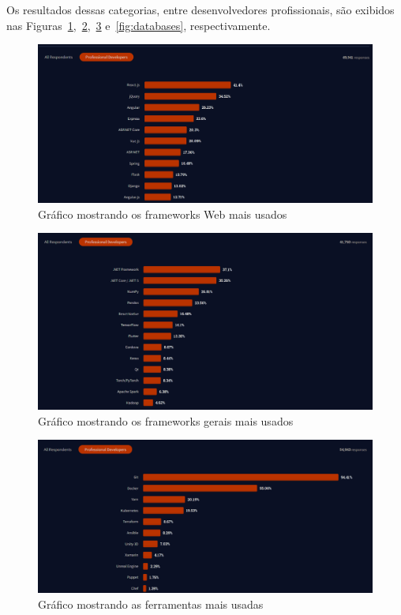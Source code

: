 \documentclass[12pt]{article}
\begin{document}
Os resultados dessas categorias, entre desenvolvedores profissionais, são exibidos nas
Figuras~\ref{fig:web-frameworks},~\ref{fig:general-frameworks},~\ref{fig:tools} e~\ref{fig:databases}, respectivamente.

\begin{figure}[H]
  \centering
  \includegraphics[width=1\textwidth]{web_frameworks_usage.png}
  \caption{Gráfico mostrando os frameworks Web mais usados}\label{fig:web-frameworks}
\end{figure}

\begin{figure}[H]
  \centering
  \includegraphics[width=1\textwidth]{general_framework_usage.png}
  \caption{Gráfico mostrando os frameworks gerais mais usados}\label{fig:general-frameworks}
\end{figure}

\begin{figure}[H]
  \centering
  \includegraphics[width=1\textwidth]{used_tools.png}
  \caption{Gráfico mostrando as ferramentas mais usadas}\label{fig:tools}
\end{figure}
\end{document}
